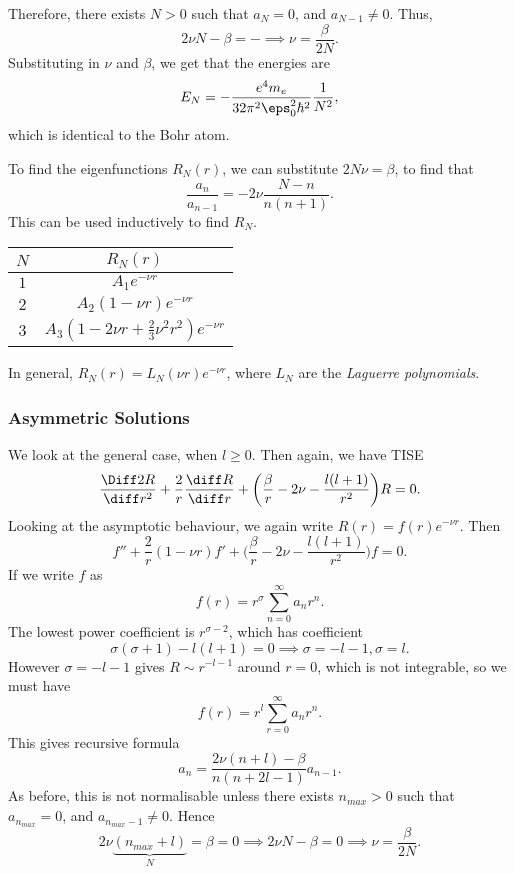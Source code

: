 \documentclass[12pt]{article}
\begin{document}
Therefore, there exists $N > 0$ such that $a_N = 0$, and $a_{N-1} \neq 0$. Thus,
\[
2 \nu N - \beta = - \implies \nu = \frac{\beta}{2 N}
.\]
Substituting in $\nu$ and $\beta$, we get that the energies are
\[
E_N = - \frac{e^{4}m_e}{32 \pi^2 \eps_0^2 \hbar^2} \frac{1}{N^2}
,\]
which is identical to the Bohr atom.

To find the eigenfunctions $R_N(r)$, we can substitute $2N \nu = \beta$, to find that
\[
	\frac{a_n}{a_{n-1}} = - 2 \nu \frac{N - n}{n(n+1)}
.\]
This can be used inductively to find $R_N$.

\begin{center}
\begin{tabular}{c|c}
	$N$ & $R_N(r)$ \\
	\hline
	$1$ & $A_1 e^{-\nu r}$ \\
	$2$ & $A_2(1 - \nu r)e^{-\nu r}$ \\
	$3$ & $A_3(1 - 2 \nu r + \frac{2}{3} \nu^2 r^2)e^{-\nu r}$ \\
\end{tabular}
\end{center}

In general, $R_N(r) = L_N(\nu r)e^{-\nu r}$, where $L_N$ are the \textit{Laguerre polynomials}.

\subsubsection{Asymmetric Solutions}%
\label{subsub:asymmetric_solutions}

We look at the general case, when $l \geq 0$. Then again, we have TISE
\[
	\frac{\Diff2 R}{\diff r^2} + \frac{2}{r}\frac{\diff R}{\diff r} + \biggl( \frac{\beta}{r} - 2 \nu - \frac{l(l+1)}{r^2}\biggr) R = 0
.\]
Looking at the asymptotic behaviour, we again write $R(r) = f(r) e^{- \nu r}$. Then
\[
	f'' + \frac{2}{r}(1 - \nu r)f' + \biggl( \frac{\beta}{r} - 2 \nu - \frac{l(l+1)}{r^2}\biggr)f = 0
.\]
If we write $f$ as
\[
	f(r) = r^{\sigma}\sum_{n = 0}^{\infty}a_nr^{n}
.\]
The lowest power coefficient is $r^{\sigma - 2}$, which has coefficient
\[
	\sigma(\sigma + 1) - l(l+1) = 0 \implies \sigma = -l-1, \sigma = l
.\]
However $\sigma = -l-1$ gives $R \sim r^{-l-1}$ around $r = 0$, which is not integrable, so we must have
\[
	f(r) = r^{l} \sum_{r = 0}^{\infty} a_n r^{n}
.\]
This gives recursive formula
\[
	a_n = \frac{2\nu(n + l) - \beta}{n(n+2l - 1)}a_{n-1}
.\]
As before, this is not normalisable unless there exists $n_{max} > 0$ such that $a_{n_{max}} = 0$, and $a_{n_{max}-1} \neq 0$. Hence
\[
	2\nu\underbrace{(n_{max} + l)}_{N} = \beta = 0 \implies 2 \nu N - \beta = 0 \implies \nu = \frac{\beta}{2N}
.\]
\end{document}
